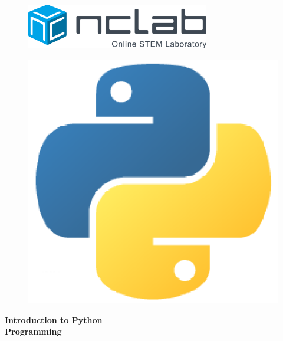 \documentclass[article,A4,12pt]{llncs}
\begin{document}

\pagestyle{empty}

\vbox{}
\begin{figure}[!ht]
\includegraphics[width=8cm]{img/logo.png}
\vspace{10mm}
\end{figure}
\vbox{}
\vspace{0.5cm}


\begin{figure}[!ht]
\begin{center}
\vspace{-6mm}
\includegraphics[width=0.3\textheight]{img/python-logo.png}
\vbox{}
\vspace{-9mm}
\end{center}
\end{figure}
\begin{center}
\vspace{2cm}
{\huge \bf Introduction to Python\\ Programming}
\end{center}
\end{document}
